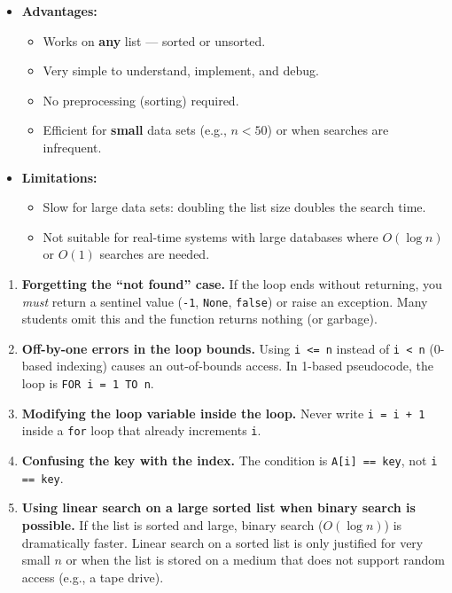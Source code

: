 \documentclass[11pt]{article}
\newcounter{popsec}
\newcounter{popsub}
\newcommand{\courssub}[1]{%
  \stepcounter{popsub}%
  \par\vspace{9pt}\noindent{\popxbold\fontsize{11.5}{13}\selectfont\color{popink}{\color{poporange}\thepopsec.\thepopsub}\hspace{6pt}#1}\par\nopagebreak\vspace{4pt}
}
\begin{document}
\begin{aretenir}
\begin{itemize}
    \item \textbf{Advantages:}
    \begin{itemize}
        \item Works on \textbf{any} list — sorted or unsorted.
        \item Very simple to understand, implement, and debug.
        \item No preprocessing (sorting) required.
        \item Efficient for \textbf{small} data sets (e.g., $n < 50$) or when searches are infrequent.
    \end{itemize}
    \item \textbf{Limitations:}
    \begin{itemize}
        \item Slow for large data sets: doubling the list size doubles the search time.
        \item Not suitable for real-time systems with large databases where $O(\log n)$ or $O(1)$ searches are needed.
    \end{itemize}
\end{itemize}
\end{aretenir}

\courssub{Common Mistakes and Traps}

\begin{attention}
\begin{enumerate}
    \item \textbf{Forgetting the ``not found'' case.} If the loop ends without returning, you \emph{must} return a sentinel value (\texttt{-1}, \texttt{None}, \texttt{false}) or raise an exception. Many students omit this and the function returns nothing (or garbage).
    \item \textbf{Off-by-one errors in the loop bounds.} Using \texttt{i <= n} instead of \texttt{i < n} (0-based indexing) causes an out-of-bounds access. In 1-based pseudocode, the loop is \texttt{FOR i = 1 TO n}.
    \item \textbf{Modifying the loop variable inside the loop.} Never write \texttt{i = i + 1} inside a \texttt{for} loop that already increments \texttt{i}.
    \item \textbf{Confusing the key with the index.} The condition is \texttt{A[i] == key}, not \texttt{i == key}.
    \item \textbf{Using linear search on a large sorted list when binary search is possible.} If the list is sorted and large, binary search ($O(\log n)$) is dramatically faster. Linear search on a sorted list is only justified for very small $n$ or when the list is stored on a medium that does not support random access (e.g., a tape drive).
\end{enumerate}
\end{attention}
\end{document}

